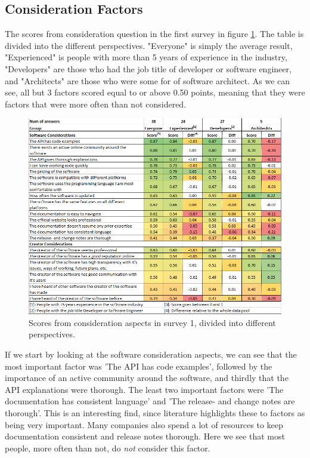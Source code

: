 \documentclass{cslthse-msc}
\begin{document}
    \subsection{Consideration Factors}
    The scores from consideration question in the first survey in figure \ref{fig:scopresByPoints}. The table is divided into the different perspectives. "Everyone" is simply the average result, "Experienced" is people with more than 5 years of experience in the industry, "Developers" are those who had the job title of developer or software engineer, and "Architects" are those who were some for of software architect.
    As we can see, all but 3 factors scored equal to or above 0.50 points, meaning that they
    were factors that were more often than not considered.
    \begin{figure}[H]
        \centering
        \includegraphics[width=\linewidth]{ScoresByPoints.png}
        \caption{Scores from consideration aspects in survey 1, divided into different perspectives.}
        \label{fig:scopresByPoints}
    \end{figure}
    If we start by looking at the software consideration aspects, we can see that the most important
    factor was 'The API has code examples', followed by the importance of an
    active community around the software, and thirdly that the API
    explanations were thorough. The least two important factors were 'The
    documentation has consistent language' and 'The release- and change
    notes are thorough'.
    This is an interesting find, since literature highlights these to factors as being very important. Many companies also spend a lot of resources to keep documentation consistent and release notes thorough. Here we see that most people, more often than not, do \textit{not} consider this factor.
\end{document}
